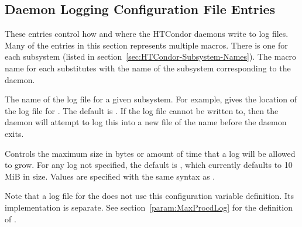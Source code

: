 \subsection{\label{sec:Daemon-Logging-Config-File-Entries}Daemon Logging Configuration File Entries} 

These entries control how and where the HTCondor daemons write to log
files.  Many of the entries in this section represents multiple
macros. There is one for each subsystem (listed
in section~\ref{sec:HTCondor-Subsystem-Names}).
The macro name for each substitutes  with the name
of the subsystem corresponding to the daemon.
\begin{description}
  
\label{param:SubsysLog}
\item[\MacroB{<SUBSYS>\_LOG}]
  The name of
  the log file for a given subsystem.  For example,
   gives the location of the log file for
  . The default is .
  If the log file cannot be written to,
  then the daemon will attempt to log this into a new file of the name
   before the daemon exits.

\label{param:MaxSubsysLog}
\item[\Macro{MAX\_<SUBSYS>\_LOG}]
  Controls the maximum size in bytes or amount of time that a
  log will be allowed to grow. 
  For any log not specified, the default is ,
  which currently defaults to 10  MiB in size.
  Values are specified with the same syntax as .

  Note that a log file for the  does not use this configuration
  variable definition. 
  Its implementation is separate.  
  See section~\ref{param:MaxProcdLog} for the definition of
  .
 

\end{description}
